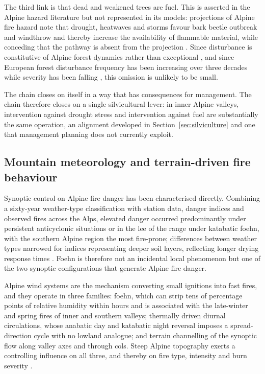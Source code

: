 \documentclass[11pt,a4paper]{article}
\begin{document}
The third link is that dead and weakened trees are fuel. This is asserted in the Alpine hazard literature but not represented in its models: projections of Alpine fire hazard note that drought, heatwaves and storms favour bark beetle outbreak and windthrow and thereby increase the availability of flammable material, while conceding that the pathway is absent from the projection \citep{gerberding_mapping_2025}. Since disturbance is constitutive of Alpine forest dynamics rather than exceptional \citep{bebi_changes_2017}, and since European forest disturbance frequency has been increasing over three decades while severity has been falling \citep{senf_mapping_2021}, this omission is unlikely to be small.

The chain closes on itself in a way that has consequences for management. The chain therefore closes on a single silvicultural lever: in inner Alpine valleys, intervention against drought stress and intervention against fuel are substantially the same operation, an alignment developed in Section~\ref{sec:silviculture} and one that management planning does not currently exploit.

\subsection{Mountain meteorology and terrain-driven fire behaviour}

Synoptic control on Alpine fire danger has been characterised directly. Combining a sixty-year weather-type classification with station data, danger indices and observed fires across the Alps, elevated danger occurred predominantly under persistent anticyclonic situations or in the lee of the range under katabatic foehn, with the southern Alpine region the most fire-prone; differences between weather types narrowed for indices representing deeper soil layers, reflecting longer drying response times \citep{wastl_largescale_2013}. Foehn is therefore not an incidental local phenomenon but one of the two synoptic configurations that generate Alpine fire danger.

Alpine wind systems are the mechanism converting small ignitions into fast fires, and they operate in three families: foehn, which can strip tens of percentage points of relative humidity within hours and is associated with the late-winter and spring fires of inner and southern valleys; thermally driven diurnal circulations, whose anabatic day and katabatic night reversal imposes a spread-direction cycle with no lowland analogue; and terrain channelling of the synoptic flow along valley axes and through cols. Steep Alpine topography exerts a controlling influence on all three, and thereby on fire type, intensity and burn severity \citep{melzner_wildfire-induced_2025}.
\end{document}
